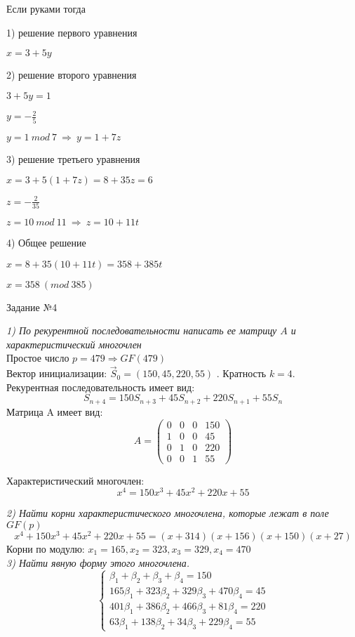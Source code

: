 Если руками тогда

1) решение первого уравнения

$x = 3 + 5y$

2) решение второго уравнения

$3 + 5y = 1$

$y = -\frac{2}{5}$

$y = 1 ~ mod ~ 7 ~ \Rightarrow ~ y = 1 + 7z$

3) решение третьего уравнения

$x = 3 + 5(1 + 7z) = 8 + 35z = 6$

$z = -\frac{2}{35}$

$z = 10 ~ mod ~ 11 ~ \Rightarrow ~ z = 10 + 11t$

4) Общее решение

$x = 8 + 35(10 + 11t) = 358 + 385t$

$x = 358 ~ (mod ~ 385)$

\begin{title}
  Задание №4
\end{title}
\emph {1) По рекурентной последовательности написать ее матрицу
$A$ и характеристический многочлен}\\
Простое число $p = 479 \Rightarrow GF(479)$\\
Вектор инициализации: $\vec S_0 = (150, 45, 220, 55)$ . Кратность $k = 4$.\\
Рекурентная последовательность имеет вид:
\[S_{n+4} = 150S_{n+3} + 45S_{n+2} + 220S_{n+1} + 55S_n\]
Матрица A имеет вид:\\

$$
A =
\left(
\begin{array}{lccr}
  0 & 0 & 0 & 150\\
  1 & 0 & 0 & 45\\
  0 & 1 & 0 & 220\\
  0 & 0 & 1 & 55
\end{array}
\right)
$$

Характеристический многочлен:
\[x^4 = 150x^3 + 45x^2 + 220x + 55\]

\emph {2) Найти корни характеристического многочлена, которые лежат в поле
$GF(p)$}\\
\[x^4 + 150x^3 + 45x^2 + 220x + 55 = (x + 314)(x + 156)(x + 150)(x + 27)\]
Корни по модулю: $x_1 = 165, x_2 = 323, x_3 = 329, x_4 = 470$\\

\emph {3) Найти явную форму этого многочлена.}
\begin{equation*}
 \begin{cases}
    \beta_1 + \beta_2 + \beta_3 + \beta_4 = 150\\
    165\beta_1 + 323\beta_2  + 329\beta_3 + 470\beta_4 = 45\\
    401\beta_1 +386 \beta_2 + 466\beta_3 + 81\beta_4 = 220\\
    63\beta_1 + 138\beta_2 + 34\beta_3 + 229\beta_4 = 55
 \end{cases}
\end{equation*}

